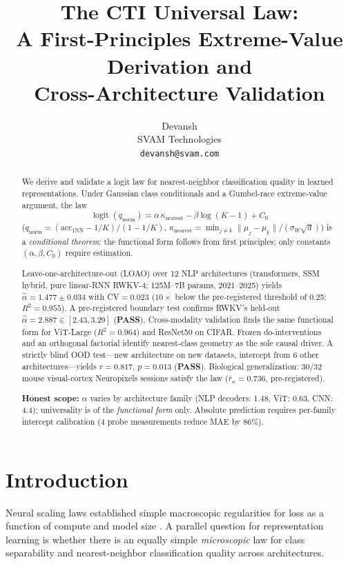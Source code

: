 \documentclass{article}
\title{The CTI Universal Law:\\
A First-Principles Extreme-Value Derivation and\\
Cross-Architecture Validation}
\author{Devansh \\
SVAM Technologies \\
\texttt{devansh@svam.com} \\
}
\DeclareMathOperator{\logit}{logit}
\begin{document}
\ifcolmsubmission
\linenumbers
\fi
\maketitle

\begin{abstract}
We derive and validate a logit law for nearest-neighbor classification quality in learned representations.
Under Gaussian class conditionals and a Gumbel-race extreme-value argument, the law
\begin{equation*}
\logit(q_{\mathrm{norm}})=\alpha\,\kappa_{\mathrm{nearest}}-\beta\log(K-1)+C_0
\end{equation*}
($q_{\mathrm{norm}}=(\mathrm{acc}_{1\mathrm{NN}}-1/K)/(1-1/K)$, $\kappa_{\mathrm{nearest}}=\min_{j\neq k}\|\mu_j-\mu_k\|/(\sigma_W\sqrt{d})$)
is a \emph{conditional theorem}: the functional form follows from first principles; only constants $(\alpha,\beta,C_0)$ require estimation.

Leave-one-architecture-out (LOAO) over 12 NLP architectures (transformers, SSM hybrid, pure linear-RNN RWKV-4; 125M--7B params, 2021--2025) yields $\hat\alpha=1.477\pm0.034$ with CV$=0.023$ ($10{\times}$ below the pre-registered threshold of 0.25; $R^2=0.955$).
A pre-registered boundary test confirms RWKV's held-out $\hat\alpha=2.887\in[2.43,3.29]$ (\textbf{PASS}).
Cross-modality validation finds the same functional form for ViT-Large ($R^2=0.964$) and ResNet50 on CIFAR.
Frozen do-interventions and an orthogonal factorial identify nearest-class geometry as the sole causal driver.
A strictly blind OOD test---new architecture on new datasets, intercept from 6 other architectures---yields $r=0.817$, $p=0.013$ (\textbf{PASS}).
Biological generalization: 30/32 mouse visual-cortex Neuropixels sessions satisfy the law ($\bar{r}_\kappa=0.736$, pre-registered).

\textbf{Honest scope:} $\alpha$ varies by architecture family (NLP decoders: 1.48, ViT: 0.63, CNN: 4.4); universality is of the \emph{functional form} only.
Absolute prediction requires per-family intercept calibration (4 probe measurements reduce MAE by 86\%).
\end{abstract}

\section{Introduction}
Neural scaling laws established simple macroscopic regularities for loss as a function of compute and model size \citep{kaplan2020,hoffmann2022}. A parallel question for representation learning is whether there is an equally simple \emph{microscopic} law for class separability and nearest-neighbor classification quality across architectures.
\end{document}
